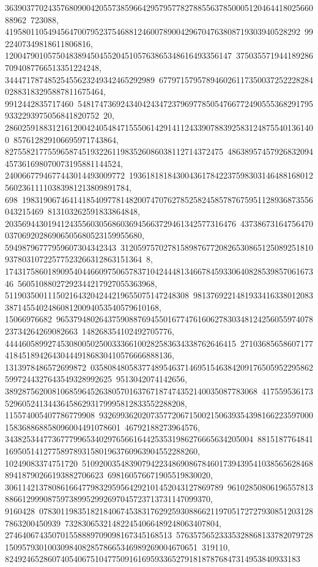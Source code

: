 {{{36390377024357680900420557385966429579577827885563785000512046441802566088962\
723088, 419580110549456470079523754688124600789004296704763808719303940528292\
9922407349818611806816, 12004790105750483894504552045105763865348616493356147\
3750355719441892867094087766513351224248, 34447178748525455623249342465292989\
67797157957894602611735003725222828402883183295887811675464, 9912442835717460\
54817473692434042434723796977850547667724905553682917959332293975056841820752\
20, 2860259188312161200424054847155506142914112433907883925831248755401361400\
857612829106695971743864, 827558217755965874519322611983526086038112714372475\
48638957457926832094457361698070073195881144524, 2400667794677443014493009772\
193618181843004361784223759830314648816801256023611110383981213809891784, 698\
19831906746414185409778148200747076278525824585787675951128936873556043215469\
813103262591833864848, 203569443019412435560305686036945663729461342577316476\
4373867316475647003706920286906505680523159955680, 59498796777959607304342343\
31205975702781589876772082653086512508925181093780310722577523266312863151364\
8, 17431758601890954044660975065783710424448134667845933064082853985706167346\
56051088027292344217927055363968, 5119035001115021643204244219655075147248308\
9813769221481933416338012083387145540248608120094053540579610168, 15066976682\
96537948026437590887694550167747616062783034812425605597407823734264269082663\
148268354102492705776, 444460589927453080050250033366100282583634338762646415\
27103685658607177418451894264304449186830410576666888136, 1313978486572699872\
03580848058377489546371469515463842091765059522958625997244327643549328992625\
9513042074142656, 38928756200810685964526380570163767187474352140035087783068\
417559536173529605241344364586293179995812833552288208, 115574005407786779908\
93269936202073577206715002150639354398166223597000158368868858096004491078601\
46792188273964576, 3438253447736777996534029765661644253531986276665634205004\
8815187764841169505141277589789315801963760963904552288260, 10249083374751720\
51092003548390794223486908678460173943954103856562846889418790266193882706623\
698160576671905519830020, 306114213780861664779832959564292101452043127869789\
96102850806196557813886612999087597389952992697045723713731147099370, 9160428\
07830119835182184067453831762925930886621197051727279308512031287863200450939\
732830653214822454066489248063407804, 274640674350701558889709098167345168513\
57635756523335328868133782079728150957930100309840828578665346989269004670651\
319110, 824924652860740540675104775091616959336527918187876847314953840933183\
}}}
